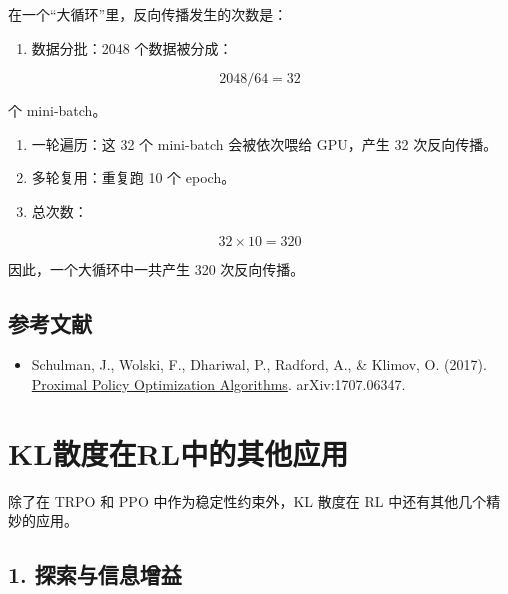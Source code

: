 在一个``大循环''里，反向传播发生的次数是：

\begin{enumerate}
\def\labelenumi{\arabic{enumi}.}
\tightlist
\item
  数据分批：2048 个数据被分成：
\end{enumerate}

\[
2048/64=32
\]

个 mini-batch。

\begin{enumerate}
\def\labelenumi{\arabic{enumi}.}
\setcounter{enumi}{1}
\tightlist
\item
  一轮遍历：这 32 个 mini-batch 会被依次喂给 GPU，产生 32 次反向传播。
\item
  多轮复用：重复跑 10 个 epoch。
\item
  总次数：
\end{enumerate}

\[
32\times 10=320
\]

因此，一个大循环中一共产生 320 次反向传播。

\hypertarget{ux53c2ux8003ux6587ux732e-56}{%
\subsection{参考文献}\label{ux53c2ux8003ux6587ux732e-56}}

\begin{itemize}
\tightlist
\item
  Schulman, J., Wolski, F., Dhariwal, P., Radford, A., \& Klimov, O. (2017). \href{https://arxiv.org/abs/1707.06347}{Proximal Policy Optimization Algorithms}. arXiv:1707.06347.
\end{itemize}

\clearpage

\hypertarget{klux6563ux5ea6ux5728rlux4e2dux7684ux5176ux4ed6ux5e94ux7528}{%
\section{KL散度在RL中的其他应用}\label{klux6563ux5ea6ux5728rlux4e2dux7684ux5176ux4ed6ux5e94ux7528}}

除了在 TRPO 和 PPO 中作为稳定性约束外，KL 散度在 RL 中还有其他几个精妙的应用。

\hypertarget{ux63a2ux7d22ux4e0eux4fe1ux606fux589eux76ca}{%
\subsection{1. 探索与信息增益}\label{ux63a2ux7d22ux4e0eux4fe1ux606fux589eux76ca}}

